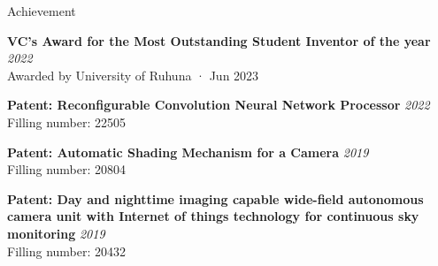 \documentclass[
	11pt, %
]{./assets/resume} %
\begin{document}
\begin{rSection}{Achievement}

	\textbf{VC's Award for the Most Outstanding Student Inventor of the year} \hfill \textit{2022} \\
	Awarded by University of Ruhuna · Jun 2023

	\textbf{Patent: Reconfigurable Convolution Neural Network Processor} \hfill \textit{2022} \\ 
	Filling number: 22505

	\textbf{Patent: Automatic Shading Mechanism for a Camera} \hfill \textit{2019} \\ 
	Filling number: 20804

	\textbf{Patent: Day and nighttime imaging capable wide-field autonomous camera unit with Internet of things technology for continuous sky monitoring} \hfill \textit{2019} \\ 
	Filling number: 20432



\end{rSection}










\end{document}
